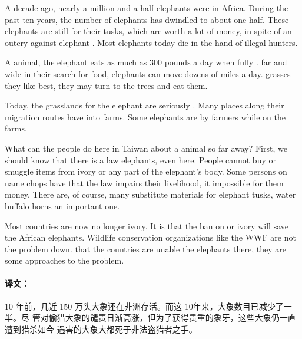A decade ago, nearly a million and a half elephants were  in
Africa. During the past ten years, the number of elephants has dwindled to
about one half. These elephants are still   for
their tusks, which are worth a lot of money, in spite of an
 outcry against elephant . Most elephants
 today die in the hand of illegal hunters.

A  animal, the elephant eats as much as 300 pounds a
day when fully .  far and wide in their search
for food, elephants can move dozens of miles a day.   grasses they like best, they may turn to the trees and eat them.

Today, the  grasslands for the elephant are seriously
. Many places along their migration routes have 
 into farms. Some elephants are  by farmers while
 on the farms.

What can the people do here in Taiwan about a  animal
 so far away? First, we should know that there is a law
 elephants, even here. People cannot buy or smuggle items
 from ivory or any part of the elephant's body. Some
 persons  on  name chops have
  that the law impairs their livelihood, 
it impossible for them  money. There are, of course, many
substitute materials for elephant tusks, water buffalo horns  an
important one.

Most countries are now no longer  ivory. It is 
that the ban on  or  ivory will save the
 African elephants. Wildlife conservation organizations like
the WWF are not  the problem  down. 
that the  countries are unable  the
elephants there, they are  some 
approaches to  the problem.

\paragraph{译文：}


10 年前，几近 150 万头大象还在非洲存活。而这 10年来，大象数目已减少了一半。尽
管对偷猎大象的谴责日渐高涨，但为了获得贵重的象牙，这些大象仍一直遭到猎杀如今
遇害的大象大都死于非法盗猎者之手。

